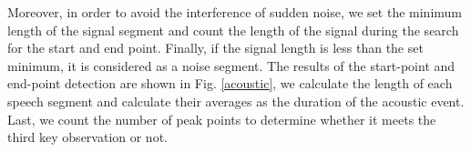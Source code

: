  Moreover, in order to avoid the interference of sudden noise, we set the minimum length of the signal segment and count the length of the signal during the search for the start and end point. Finally, if the signal length is less than the set minimum, it is considered as a noise segment. The results of the start-point and end-point detection are shown in Fig. \ref{acoustic}, we calculate the length of each speech segment and calculate their averages as the duration of the acoustic event. Last, we count the number of peak points to determine whether it meets the third key observation or not.








